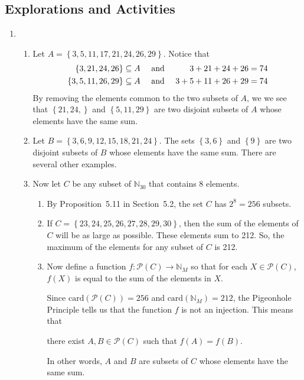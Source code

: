 \subsection*{Explorations and Activities}
\setcounter{oldenumi}{\theenumi}
\begin{enumerate} \setcounter{enumi}{\theoldenumi}
\item \begin{enumerate}
\item Let $A = \left\{ 3, 5, 11, 17, 21, 24, 26, 29 \right\}$.  Notice that
\begin{align}
\left\{3, 21, 24, 26 \right\} &\subseteq A \quad \text{ and }   &3 + 21 + 24 + 26 &= 74 \notag \\
\left\{3, 5, 11, 26, 29 \right\} &\subseteq A \quad \text{ and }   &3 + 5 + 11 + 26 + 29 &= 74 \notag
\end{align}
By removing the elements common to the two subsets of $A$, we we see that 
$\left\{21, 24,  \right\}$ and  $\left\{5, 11, 29 \right\}$ are two disjoint subsets of $A$ whose elements have the same sum.

\item Let $B = \left\{ 3, 6, 9, 12, 15, 18, 21, 24 \right\}$.  The sets $\left\{ 3, 6 \right\}$ and $\left\{ 9 \right\}$ are two disjoint subsets of $B$ whose elements have the same sum.  There are several other examples.

\item Now let $C$ be any subset of $\mathbb{N}_{30}$ that contains 8 elements.  
\begin{enumerate}
\item By Proposition~5.11 in Section~5.2, the set $C$ has $2^8 = 256$ subsets.

\item If $C = \left\{23, 24, 25, 26, 27, 28, 29, 30 \right\}$, then the sum of the elements of $C$ will be as large as possible.  These elements sum to 212.  So, the maximum of the elements for any subset of $C$ is 212.

\item Now define a function $f:\mathcal{P} \left( C \right) \to \mathbb{N}_M$ so that for each 
$X \in \mathcal{P} \left( C \right)$, $f \left( X \right)$ is equal to the sum of the elements in $X$.

Since $\text{card} \left( \mathcal{P} \left( C \right) \right) = 256$ and 
$\text{card} \left( \mathbb{N}_M \right) = 212$, the Pigeonhole Principle tells us that the function $f$ is not an injection.  This means that 
\begin{center}
there exist $A, B \in \mathcal{P} \left( C \right)$ such that 
$f \left( A \right) = f \left( B \right)$.
\end{center}
In other words, $A$ and $B$ are subsets of $C$ whose elements have the same sum.
\end{enumerate}


\end{enumerate}
\end{enumerate}
